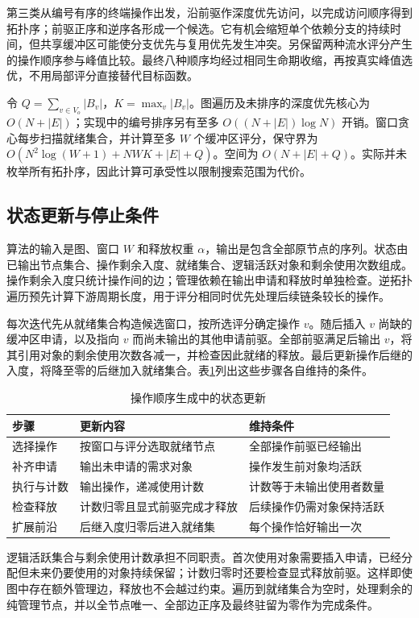 第三类从编号有序的终端操作出发，沿前驱作深度优先访问，以完成访问顺序得到拓扑序；前驱正序和逆序各形成一个候选。它有机会缩短单个依赖分支的持续时间，但共享缓冲区可能使分支优先与复用优先发生冲突。另保留两种流水评分产生的操作顺序参与峰值比较。最终八种顺序均经过相同生命期收缩，再按真实峰值选优，不用局部评分直接替代目标函数。

令 $Q=\sum_{v\in V_o}|B_v|$，$K=\max_v|B_v|$。图遍历及未排序的深度优先核心为 $O(N+|E|)$；实现中的编号排序另有至多 $O((N+|E|)\log N)$ 开销。窗口贪心每步扫描就绪集合，并计算至多 $W$ 个缓冲区评分，保守界为 $O(N^2\log(W+1)+NWK+|E|+Q)$。空间为 $O(N+|E|+Q)$。实际并未枚举所有拓扑序，因此计算可承受性以限制搜索范围为代价。

\subsection{状态更新与停止条件}
算法的输入是图、窗口 $W$ 和释放权重 $\alpha$，输出是包含全部原节点的序列。状态由已输出节点集合、操作剩余入度、就绪集合、逻辑活跃对象和剩余使用次数组成。操作剩余入度只统计操作间的边；管理依赖在输出申请和释放时单独检查。逆拓扑遍历预先计算下游周期长度，用于评分相同时优先处理后续链条较长的操作。

每次迭代先从就绪集合构造候选窗口，按所选评分确定操作 $v$。随后插入 $v$ 尚缺的缓冲区申请，以及指向 $v$ 而尚未输出的其他申请前驱。全部前驱满足后输出 $v$，将其引用对象的剩余使用次数各减一，并检查因此就绪的释放。最后更新操作后继的入度，将降至零的后继加入就绪集合。表\ref{tab:q1steps}列出这些步骤各自维持的条件。
\begin{table}[H]\centering{}
\caption{操作顺序生成中的状态更新}\label{tab:q1steps}
\begin{tabular}{p{.18\linewidth}p{.36\linewidth}p{.34\linewidth}}\toprule
步骤&更新内容&维持条件\\\midrule
选择操作&按窗口与评分选取就绪节点&全部操作前驱已经输出\\
补齐申请&输出未申请的需求对象&操作发生前对象均活跃\\
执行与计数&输出操作，递减使用计数&计数等于未输出使用者数量\\
检查释放&计数归零且显式前驱完成才释放&后续操作仍需对象保持活跃\\
扩展前沿&后继入度归零后进入就绪集&每个操作恰好输出一次\\\bottomrule
\end{tabular}\end{table}

逻辑活跃集合与剩余使用计数承担不同职责。首次使用对象需要插入申请，已经分配但未来仍要使用的对象持续保留；计数归零时还要检查显式释放前驱。这样即使图中存在额外管理边，释放也不会越过约束。遍历到就绪集合为空时，处理剩余的纯管理节点，并以全节点唯一、全部边正序及最终驻留为零作为完成条件。

